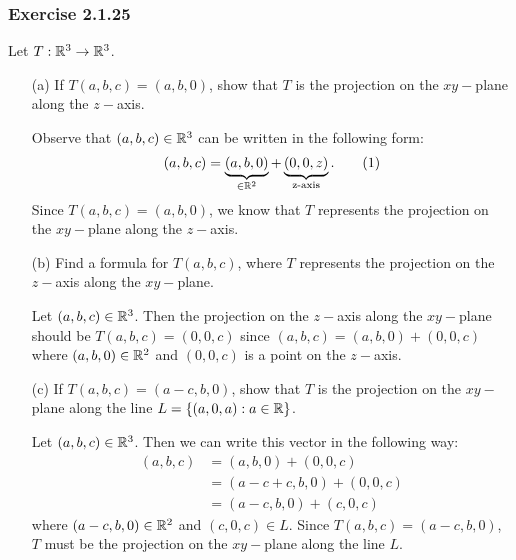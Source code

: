 \subsubsection{Exercise 2.1.25} Let \( T: \mathbb{R}^{3} \to \mathbb{R}^{3} \).
\begin{enumerate}
    \item[(a)] If \( T(a,b,c) = (a,b,0)  \), show that \( T  \) is the projection on the \( xy- \)plane along the \( z- \)axis.
        \begin{solution}
        Observe that \( (a,b,c) \in \mathbb{R}^{3} \) can be written in the following form:
        \[  (a,b,c) = \underbrace{(a,b, 0)}_{\in \mathbb{R}^{2}} + \underbrace{(0,0,z)}_{\text{z-axis}}. \tag{1} \]
        Since \( T(a,b,c) = (a,b,0)  \), we know that \( T  \) represents the projection on the \( xy- \)plane along the \( z- \)axis. 
        \end{solution}
    \item[(b)] Find a formula for \( T(a,b,c) \), where \( T  \) represents the projection on the \( z- \)axis along the \( xy- \)plane.
        \begin{solution}
        Let \( (a,b,c) \in \mathbb{R}^{3}  \). Then the projection on the \( z- \)axis along the \( xy- \)plane should be \( T(a,b,c) = (0,0,c) \) since \( (a,b,c) = (a,b,0) + (0,0,c) \) where \( (a,b,0) \in \mathbb{R}^{2} \) and \( (0,0,c)  \) is a point on the \( z- \)axis.
        \end{solution}
    \item[(c)] If \( T(a,b,c) = (a-c,b,0) \), show that \( T  \) is the projection on the \( xy- \)plane along the line \( L = \{ (a,0,a) :  a \in \mathbb{R}  \}  \).
        \begin{solution}
        Let \( (a,b,c) \in \mathbb{R}^{3} \). Then we can write this vector in the following way:
        \begin{align*}  
        (a,b,c) &= (a,b,0) + (0,0,c) \\  
                &=  (a -c + c , b , 0) + (0,0,c) \\ 
                &= (a-c, b , 0 ) + (c, 0 , c ) 
        \end{align*}
        where \( (a-c,b,0) \in \mathbb{R}^{2}  \) and \( (c,0,c) \in L   \). Since \( T(a,b,c) = (a-c,b,0) \), \( T \) must be the projection on the \( xy- \)plane along the line \( L \).  
    \end{solution}
\end{enumerate}

